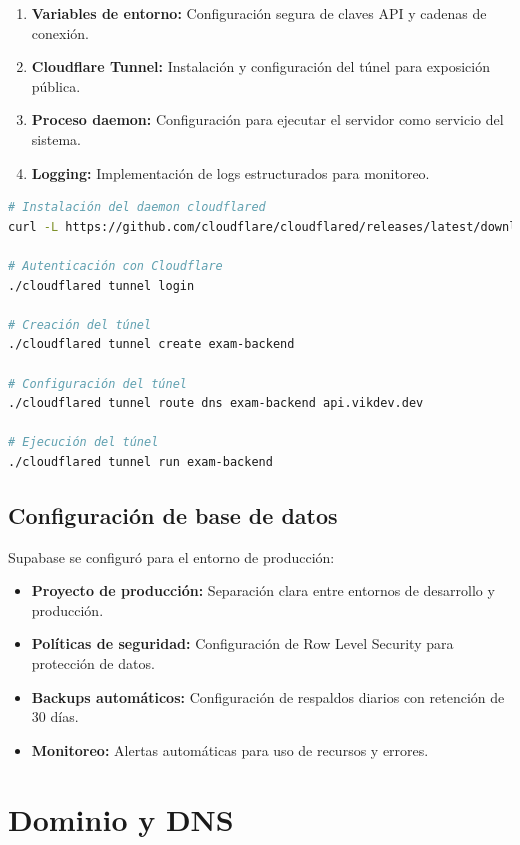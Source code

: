 \documentclass[12pt,a4paper]{report}
\begin{document}
\begin{enumerate}
\item \textbf{Variables de entorno:} Configuración segura de claves API y cadenas de conexión.
\item \textbf{Cloudflare Tunnel:} Instalación y configuración del túnel para exposición pública.
\item \textbf{Proceso daemon:} Configuración para ejecutar el servidor como servicio del sistema.
\item \textbf{Logging:} Implementación de logs estructurados para monitoreo.
\end{enumerate}

\begin{lstlisting}[language=bash, caption=Configuración del túnel Cloudflare]
# Instalación del daemon cloudflared
curl -L https://github.com/cloudflare/cloudflared/releases/latest/download/cloudflared-linux-amd64 -o cloudflared

# Autenticación con Cloudflare
./cloudflared tunnel login

# Creación del túnel
./cloudflared tunnel create exam-backend

# Configuración del túnel
./cloudflared tunnel route dns exam-backend api.vikdev.dev

# Ejecución del túnel
./cloudflared tunnel run exam-backend
\end{lstlisting}

\subsection{Configuración de base de datos}

Supabase se configuró para el entorno de producción:

\begin{itemize}
\item \textbf{Proyecto de producción:} Separación clara entre entornos de desarrollo y producción.
\item \textbf{Políticas de seguridad:} Configuración de Row Level Security para protección de datos.
\item \textbf{Backups automáticos:} Configuración de respaldos diarios con retención de 30 días.
\item \textbf{Monitoreo:} Alertas automáticas para uso de recursos y errores.
\end{itemize}

\section{Dominio y DNS}
\end{document}
